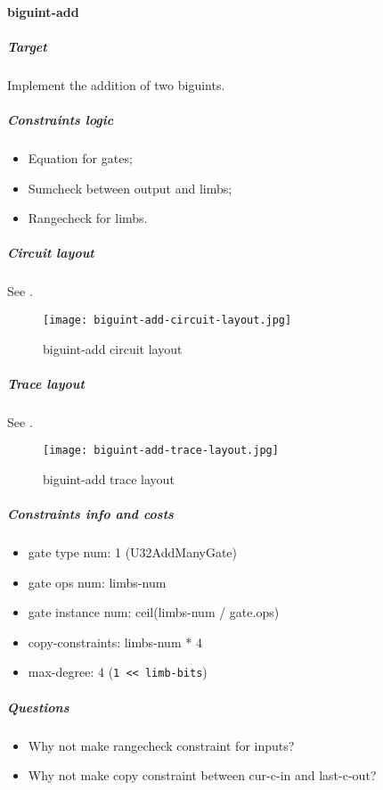 \paragraph{biguint-add}

\subparagraph{Target}
Implement the addition of two biguints.

\subparagraph{Constraints logic}
\begin{itemize}
    \item Equation for gates;
    \item Sumcheck between output and limbs;
    \item Rangecheck for limbs.
\end{itemize}

\subparagraph{Circuit layout}
See .
\begin{figure}[!ht]
    \centering
    \texttt{[image: biguint-add-circuit-layout.jpg]}
    \caption{biguint-add circuit layout}
    \label{fig:biguint-add-circuit-layout}
\end{figure}

\subparagraph{Trace layout}
See .
\begin{figure}[!ht]
    \centering
    \texttt{[image: biguint-add-trace-layout.jpg]}
    \caption{biguint-add trace layout}
    \label{fig:biguint-add-trace-layout}
\end{figure}

\subparagraph{Constraints info and costs}
\begin{itemize}
    \item gate type num: 1 (U32AddManyGate)
    \item gate ops num: limbs-num
    \item gate instance num: ceil(limbs-num / gate.ops)
    \item copy-constraints: limbs-num * 4
    \item max-degree: 4 (\verb|1 << limb-bits|)
\end{itemize}

\subparagraph{Questions}
\begin{itemize}
    \item Why not make rangecheck constraint for inputs?
    \item Why not make copy constraint between cur-c-in and last-c-out?
\end{itemize}
